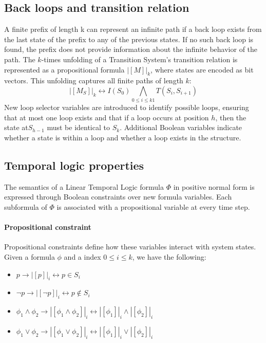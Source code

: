 \subsection{Back loops and transition relation}
A finite prefix of length k can represent an infinite path if a back loop exists from the last state of the prefix to any of the previous states. 
If no such back loop is found, the prefix does not provide information about the infinite behavior of the path. 
The $k$-times unfolding of a Transition System's transition relation is represented as a propositional formula ${\left\lvert [M]\right\rvert}_k$, where states are encoded as bit vectors.
This unfolding captures all finite paths of length $k$: 
\[{\left\lvert [M_S]\right\rvert}_k\leftrightarrow I(S_0)\bigwedge_{0\leq i \leq k1}T(S_i,S_{i+1}) \]
New loop selector variables are introduced to identify possible loops, ensuring that at most one loop exists and that if a loop occurs at position $h$, then the state at$S_{h-1}$ must be identical to $S_k$. 
Additional Boolean variables indicate whether a state is within a loop and whether a loop exists in the structure.

\subsection{Temporal logic properties}
The semantics of a Linear Temporal Logic formula $\Phi$ in positive normal form is expressed through Boolean constraints over new formula variables.
Each subformula of $\Phi$  is associated with a propositional variable at every time step.

\paragraph*{Propositional constraint}
Propositional constraints define how these variables interact with system states.
Given a formula $\phi$ and a index $0\leq i\leq k$, we have the following: 
\begin{itemize}
    \item $p\rightarrow{\left\lvert [p]\right\rvert}_i\leftrightarrow p\in S_i$
    \item $\lnot p\rightarrow{\left\lvert [\lnot p]\right\rvert}_i\leftrightarrow p\notin S_i$
    \item $\phi_1\land\phi_2\rightarrow{\left\lvert [\phi_1\land\phi_2]\right\rvert}_i\leftrightarrow{\left\lvert [\phi_1]\right\rvert}_i\land {\left\lvert [\phi_2]\right\rvert}_i$
    \item $\phi_1\lor\phi_2\rightarrow{\left\lvert [\phi_1\lor\phi_2]\right\rvert}_i\leftrightarrow{\left\lvert [\phi_1]\right\rvert}_i\lor {\left\lvert [\phi_2]\right\rvert}_i$
\end{itemize}


